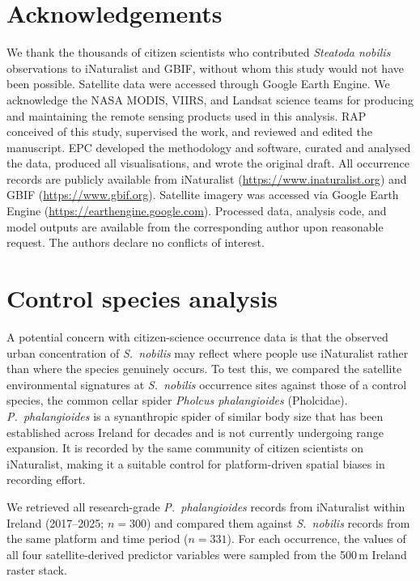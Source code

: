 \documentclass[11pt, a4paper, twocolumn]{article}
\begin{document}
\section*{Acknowledgements}

We thank the thousands of citizen scientists who contributed \textit{Steatoda nobilis} observations to iNaturalist and 
GBIF, without whom this study would not have been possible. Satellite data were accessed through Google Earth Engine. 
We acknowledge the NASA MODIS, VIIRS, and Landsat science teams for producing and maintaining the remote sensing products 
used in this analysis. RAP conceived of this study, supervised the work, 
and reviewed and edited the manuscript. 
EPC developed the methodology and software, curated and analysed the data, 
produced all visualisations, and wrote the original draft. 
All occurrence records are publicly available from iNaturalist 
(\url{https://www.inaturalist.org}) and GBIF (\url{https://www.gbif.org}). Satellite imagery was accessed via Google Earth 
Engine (\url{https://earthengine.google.com}). Processed data, analysis code, and model outputs are available from the 
corresponding author upon reasonable request. The authors declare no conflicts of interest.



\appendix

\section{Control species analysis}
\label{app:control}

A potential concern with citizen-science occurrence data is that the observed urban concentration of \textit{S.~nobilis} may reflect where people use iNaturalist rather than where the species genuinely occurs. To test this, we compared the satellite environmental signatures at \textit{S.~nobilis} occurrence sites against those of a control species, the common cellar spider \textit{Pholcus phalangioides} (Pholcidae). \textit{P.~phalangioides} is a synanthropic spider of similar body size that has been established across Ireland for decades and is not currently undergoing range expansion. It is recorded by the same community of citizen scientists on iNaturalist, making it a suitable control for platform-driven spatial biases in recording effort.

We retrieved all research-grade \textit{P.~phalangioides} records from iNaturalist within Ireland (2017--2025; $n = 300$) and compared them against \textit{S.~nobilis} records from the same platform and time period ($n = 331$). For each occurrence, the values of all four satellite-derived predictor variables were sampled from the 500\,m Ireland raster stack.
\end{document}
